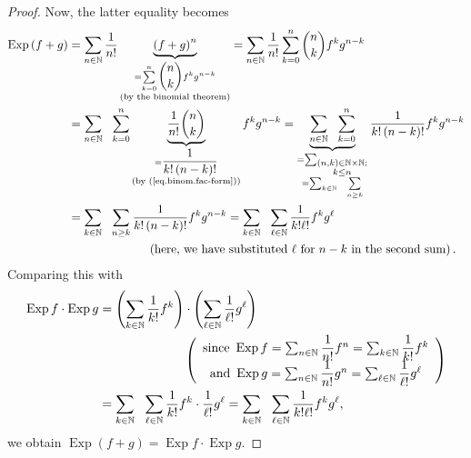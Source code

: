 \begin{proof}
Now, the latter equality becomes%
\begin{align*}
\operatorname*{Exp}\left(  f+g\right)   &  =\sum_{n\in\mathbb{N}}\dfrac{1}%
{n!}\underbrace{\left(  f+g\right)  ^{n}}_{\substack{=\sum\limits_{k=0}%
^{n}\dbinom{n}{k}f^{k}g^{n-k}\\\text{(by the binomial theorem)}}}=\sum
_{n\in\mathbb{N}}\dfrac{1}{n!}\sum\limits_{k=0}^{n}\dbinom{n}{k}f^{k}g^{n-k}\\
&  =\sum_{n\in\mathbb{N}}\ \ \sum\limits_{k=0}^{n}\underbrace{\dfrac{1}%
{n!}\dbinom{n}{k}}_{\substack{=\dfrac{1}{k!\left(  n-k\right)  !}\\\text{(by
(\ref{eq.binom.fac-form}))}}}f^{k}g^{n-k}=\underbrace{\sum_{n\in\mathbb{N}%
}\ \ \sum\limits_{k=0}^{n}}_{\substack{=\sum_{\substack{\left(  n,k\right)
\in\mathbb{N}\times\mathbb{N};\\k\leq n}}\\=\sum_{k\in\mathbb{N}}%
\ \ \sum\limits_{n\geq k}}}\dfrac{1}{k!\left(  n-k\right)  !}f^{k}g^{n-k}\\
&  =\sum_{k\in\mathbb{N}}\ \ \sum\limits_{n\geq k}\dfrac{1}{k!\left(
n-k\right)  !}f^{k}g^{n-k}=\sum_{k\in\mathbb{N}}\ \ \sum\limits_{\ell
\in\mathbb{N}}\dfrac{1}{k!\ell!}f^{k}g^{\ell}\\
&  \ \ \ \ \ \ \ \ \ \ \ \ \ \ \ \ \ \ \ \ \left(  \text{here, we have
substituted }\ell\text{ for }n-k\text{ in the second sum}\right)  .
\end{align*}
Comparing this with%
\begin{align*}
\operatorname*{Exp}f\cdot\operatorname*{Exp}g  &  =\left(  \sum_{k\in
\mathbb{N}}\dfrac{1}{k!}f^{k}\right)  \cdot\left(  \sum_{\ell\in\mathbb{N}%
}\dfrac{1}{\ell!}g^{\ell}\right) \\
&  \ \ \ \ \ \ \ \ \ \ \ \ \ \ \ \ \ \ \ \ \left(
\begin{array}
[c]{c}%
\text{since }\operatorname*{Exp}f=\sum_{n\in\mathbb{N}}\dfrac{1}{n!}f^{n}%
=\sum_{k\in\mathbb{N}}\dfrac{1}{k!}f^{k}\\
\text{and }\operatorname*{Exp}g=\sum_{n\in\mathbb{N}}\dfrac{1}{n!}g^{n}%
=\sum_{\ell\in\mathbb{N}}\dfrac{1}{\ell!}g^{\ell}%
\end{array}
\right) \\
&  =\sum_{k\in\mathbb{N}}\ \ \sum_{\ell\in\mathbb{N}}\dfrac{1}{k!}f^{k}%
\cdot\dfrac{1}{\ell!}g^{\ell}=\sum_{k\in\mathbb{N}}\ \ \sum_{\ell\in
\mathbb{N}}\dfrac{1}{k!\ell!}f^{k}g^{\ell},
\end{align*}
we obtain $\operatorname*{Exp}\left(  f+g\right)  =\operatorname*{Exp}%
f\cdot\operatorname*{Exp}g$.


\end{proof}

